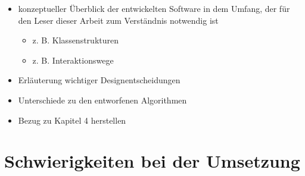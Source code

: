 \documentclass[../main/thesis.tex]{subfiles}
\begin{document}
\begin{itemize}
	\item konzeptueller Überblick der entwickelten Software in dem Umfang, der für den Leser dieser Arbeit zum Verständnis notwendig ist
	\begin{itemize}
		\item z. B. Klassenstrukturen
		\item z. B. Interaktionswege
	\end{itemize}
	\item Erläuterung wichtiger Designentscheidungen
	\item Unterschiede zu den entworfenen Algorithmen
	\item Bezug zu Kapitel 4 herstellen
\end{itemize}



\section{Schwierigkeiten bei der Umsetzung}
\label{ch:impl-difficulties}

\end{document}

